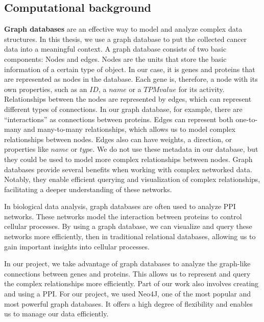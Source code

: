 \subsection{Computational background} \label{subsec:computational_background}

\textbf{Graph databases} are an effective way to model and analyze complex data structures.
In this thesis, we use a graph database to put the collected cancer data into a meaningful context.
A graph database consists of two basic components: Nodes and edges.
Nodes are the units that store the basic information of a certain type of object.
In our case, it is genes and proteins that are represented as nodes in the database.
Each gene is, therefore, a node with its own properties,
such as an $ID$, a $name$ or a $TPM value$ for its activity.
Relationships between the nodes are represented by edges, which can represent different types of connections.
In our graph database, for example, there are “interactions” as connections between proteins.
Edges can represent both one-to-many and many-to-many relationships,
which allows us to model complex relationships between nodes.
Edges also can have weights, a direction, or properties like $name$ or $type$.
We do not use these metadata in our database,
but they could be used to model more complex relationships between nodes.
Graph databases provide several benefits when working with complex networked data.
Notably, they enable efficient querying and visualization of complex relationships,
facilitating a deeper understanding of these networks.

In biological data analysis, graph databases are often used to analyze PPI networks.
These networks model the interaction between proteins to control cellular processes.
By using a graph database, we can visualize and query these networks more efficiently,
then in traditional relational databases, allowing us to gain important insights into cellular processes.

In our project, we take advantage of graph databases to analyze the graph-like connections between genes and proteins.
This allows us to represent and query the complex relationships more efficiently.
Part of our work also involves creating and using a PPI\@.
For our project, we used Neo4J, one of the most popular and most powerful graph databases.
It offers a high degree of flexibility and enables us to manage our data efficiently.
\\

